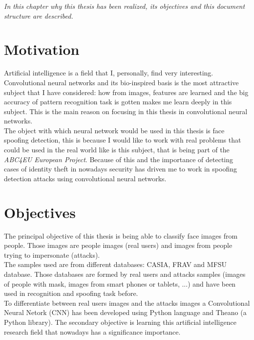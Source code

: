 \minitoc
\mtcskip

\begin{small}
\emph{In this chapter why this thesis has been realized, its objectives and this document structure are described.\\}
\end{small} 
\section{Motivation}
Artificial intelligence is a field that I, personally, find very interesting. Convolutional neural networks and its bio-inspired basis is the most attractive subject that I have considered: how from images, features are learned and the big accuracy of pattern recognition task is gotten makes me learn deeply in this subject. This is the main reason on focusing in this thesis in convolutional neural networks.\\

The object with which neural network would be used in this thesis is face spoofing detection, this is because I would like to work with real problems that could be used in the real world like is this subject, that is being part of the \textit{ABC4EU European Project}. Because of this and the importance of detecting cases of identity theft in nowadays security has driven me to work in spoofing detection attacks using convolutional neural networks.

\section{Objectives}
The principal objective of this thesis is being able to classify face images from people. Those images are people images (real users) and images from people trying to impersonate (attacks).\\

The samples used are from different databases: CASIA, FRAV and MFSU database. Those databases are formed by real users and attacks samples (images of people with mask, images from smart phones or tablets, ...) and have been used in recognition and spoofing task before.\\

To differentiate between real users images and the attacks images a Convolutional Neural Netork (CNN) has been developed using Python language and Theano (a Python library). The secondary objective is learning this artificial intelligence research field that nowadays has a significance importance.\\

